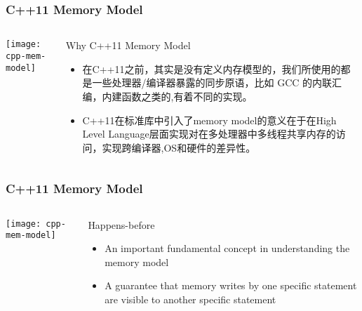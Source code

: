 \begin{frame}
    \frametitle{C++11 Memory Model}
    
    
    \begin{columns}
        
        \begin{column}{.4\textwidth}
            \texttt{[image: cpp-mem-model]}
        \end{column}
        \begin{column}{.6\textwidth}
            
            \Large
            Why C++11 Memory Model
            \normalsize
            \begin{itemize}
                \item 在C++11之前，其实是没有定义内存模型的，我们所使用的都是一些处理器/编译器暴露的同步原语，比如 GCC 的内联汇编，内建函数之类的,有着不同的实现。
                \item C++11在标准库中引入了memory model的意义在于在High Level Language层面实现对在多处理器中多线程共享内存的访问，实现跨编译器,OS和硬件的差异性。

                
                
            
                
            \end{itemize}
        \end{column}
    \end{columns}
    
\end{frame}


\begin{frame}
    \frametitle{C++11 Memory Model}
    
    
    \begin{columns}
        
        \begin{column}{.4\textwidth}
            \texttt{[image: cpp-mem-model]}
        \end{column}
        \begin{column}{.6\textwidth}
            
            \Large
            Happens-before
            \normalsize
            \begin{itemize}
                \item An important fundamental concept in understanding the
                memory model
                
                \item A guarantee that memory writes by one specific
                statement are visible to another specific statement
                
                
            \end{itemize}
            

        \end{column}
    \end{columns}
    
\end{frame}


